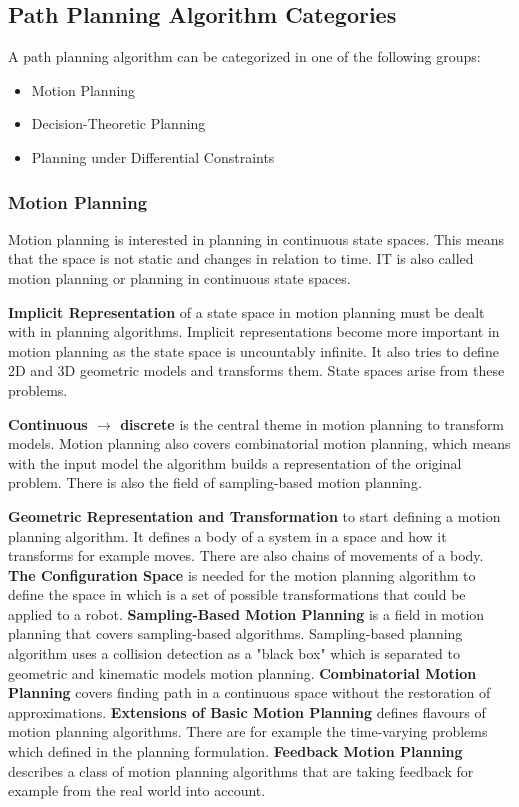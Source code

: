 \cite{planning_algorithms_steven_m_lavalle}

\subsection{Path Planning Algorithm Categories}
A path planning algorithm can be categorized in one of the following groups:
\begin{itemize}
    \item Motion Planning
    \item Decision-Theoretic Planning
    \item Planning under Differential Constraints
\end{itemize}

\subsubsection{Motion Planning}

Motion planning is interested in planning in continuous state spaces. This means that the space is not static and changes in relation to time. IT is also called motion planning or planning in continuous state spaces.

\textbf{Implicit Representation} of a state space in motion planning must be dealt with in planning algorithms. Implicit representations become more important in motion planning as the state space is uncountably infinite. It also tries to define 2D and 3D geometric models and transforms them. State spaces arise from these problems.

\textbf{Continuous $\rightarrow$ discrete} is the central theme in motion planning to transform models. Motion planning also covers combinatorial motion planning, which means with the input model the algorithm builds a representation of the original problem. There is also the field of sampling-based motion planning.

\textbf{Geometric Representation and Transformation} to start defining a motion planning algorithm. It defines a body of a system in a space and how it transforms for example moves. There are also chains of movements of a body.
\textbf{The Configuration Space} is needed for the motion planning algorithm to define the space in which is a set of possible transformations that could be applied to a robot.
\textbf{Sampling-Based Motion Planning} is a field in motion planning that covers sampling-based algorithms. Sampling-based planning algorithm uses a collision detection as a "black box" which is separated to geometric and kinematic models motion planning.
\textbf{Combinatorial Motion Planning} covers finding path in a continuous space without the restoration of approximations. 
\textbf{Extensions of Basic Motion Planning} defines flavours of motion planning algorithms. There are for example the time-varying problems which defined in the planning formulation.
\textbf{Feedback Motion Planning} describes a class of motion planning algorithms that are taking feedback for example from the real world into account.

